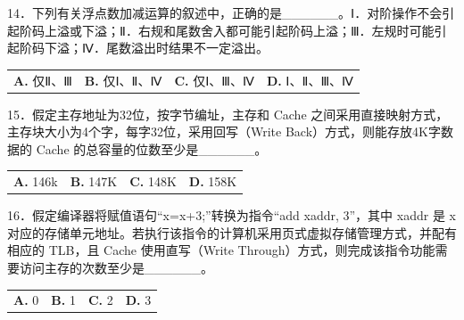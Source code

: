 \documentclass[UTF8,11pt]{ctexart}
\begin{document}
14．下列有关浮点数加减运算的叙述中，正确的是\_\_\_\_\_\_。Ⅰ．对阶操作不会引起阶码上溢或下溢；Ⅱ．右规和尾数舍入都可能引起阶码上溢；Ⅲ．左规时可能引起阶码下溢；Ⅳ．尾数溢出时结果不一定溢出。


\begin{center}\begin{tabular}{>{\raggedright\arraybackslash}p{\dimexpr(\linewidth-8\tabcolsep)/4\relax}>{\raggedright\arraybackslash}p{\dimexpr(\linewidth-8\tabcolsep)/4\relax}>{\raggedright\arraybackslash}p{\dimexpr(\linewidth-8\tabcolsep)/4\relax}>{\raggedright\arraybackslash}p{\dimexpr(\linewidth-8\tabcolsep)/4\relax}}
\textbf{A.} 仅Ⅱ、Ⅲ & \textbf{B.} 仅Ⅰ、Ⅱ、Ⅳ & \textbf{C.} 仅Ⅰ、Ⅲ、Ⅳ & \textbf{D.} Ⅰ、Ⅱ、Ⅲ、Ⅳ\\[.35em]\end{tabular}\end{center}

15．假定主存地址为32位，按字节编址，主存和 Cache 之间采用直接映射方式，主存块大小为4个字，每字32位，采用回写（Write Back）方式，则能存放4K字数据的 Cache 的总容量的位数至少是\_\_\_\_\_\_。


\begin{center}\begin{tabular}{>{\raggedright\arraybackslash}p{\dimexpr(\linewidth-8\tabcolsep)/4\relax}>{\raggedright\arraybackslash}p{\dimexpr(\linewidth-8\tabcolsep)/4\relax}>{\raggedright\arraybackslash}p{\dimexpr(\linewidth-8\tabcolsep)/4\relax}>{\raggedright\arraybackslash}p{\dimexpr(\linewidth-8\tabcolsep)/4\relax}}
\textbf{A.} 146k & \textbf{B.} 147K & \textbf{C.} 148K & \textbf{D.} 158K\\[.35em]\end{tabular}\end{center}

16．假定编译器将赋值语句“x=x+3;”转换为指令“add xaddr, 3”，其中 xaddr 是 x 对应的存储单元地址。若执行该指令的计算机采用页式虚拟存储管理方式，并配有相应的 TLB，且 Cache 使用直写（Write Through）方式，则完成该指令功能需要访问主存的次数至少是\_\_\_\_\_\_。


\begin{center}\begin{tabular}{>{\raggedright\arraybackslash}p{\dimexpr(\linewidth-8\tabcolsep)/4\relax}>{\raggedright\arraybackslash}p{\dimexpr(\linewidth-8\tabcolsep)/4\relax}>{\raggedright\arraybackslash}p{\dimexpr(\linewidth-8\tabcolsep)/4\relax}>{\raggedright\arraybackslash}p{\dimexpr(\linewidth-8\tabcolsep)/4\relax}}
\textbf{A.} 0 & \textbf{B.} 1 & \textbf{C.} 2 & \textbf{D.} 3\\[.35em]\end{tabular}\end{center}
\end{document}
